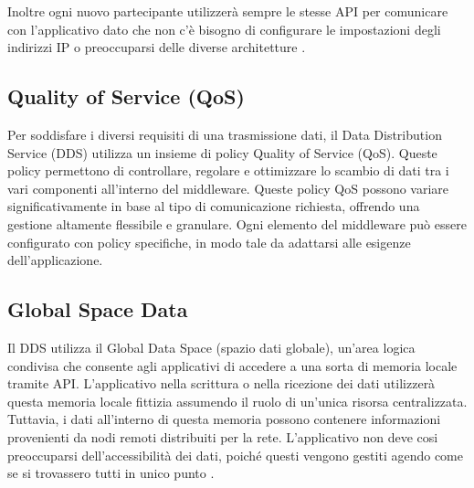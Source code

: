 Inoltre ogni nuovo partecipante 
utilizzerà sempre le stesse API per comunicare con l'applicativo dato che 
non c'è bisogno di configurare le impostazioni degli indirizzi IP o 
preoccuparsi delle diverse architetture \cite{1494965}.
 
 
\subsection{Quality of Service (QoS)}

Per soddisfare i diversi requisiti di una trasmissione dati, 
il Data Distribution Service (DDS) utilizza un insieme di policy
Quality of Service (QoS). Queste policy permettono di controllare, 
regolare e ottimizzare lo scambio di dati tra i vari componenti 
all'interno del middleware. Queste policy QoS possono variare 
significativamente in base al tipo di comunicazione richiesta, 
offrendo una gestione altamente flessibile e granulare. 
Ogni elemento del middleware può essere configurato 
con policy specifiche, in modo tale da adattarsi alle 
esigenze dell'applicazione.

\subsection{Global Space Data}
Il DDS utilizza il Global Data 
Space (spazio dati globale), un'area logica condivisa 
che consente agli applicativi
di accedere a una sorta di memoria locale tramite API.
L'applicativo nella scrittura o nella ricezione dei dati utilizzerà 
questa memoria locale fittizia assumendo il ruolo di 
un'unica risorsa centralizzata.
Tuttavia, i dati all'interno di questa memoria possono contenere
informazioni provenienti da nodi remoti distribuiti per la rete. 
L'applicativo non deve cosi preoccuparsi dell'accessibilità dei dati,
poiché questi vengono gestiti agendo come se si trovassero tutti in unico punto 
\cite{whatisdds}.


